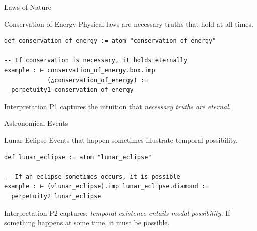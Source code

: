 \documentclass[aspectratio=169,11pt]{beamer}
\begin{document}
\begin{frame}[fragile]{Laws of Nature}

\begin{block}{Conservation of Energy}
Physical laws are necessary truths that hold at all times.
\end{block}

\begin{lstlisting}
def conservation_of_energy := atom "conservation_of_energy"

-- If conservation is necessary, it holds eternally
example : ⊢ conservation_of_energy.box.imp
            (△conservation_of_energy) :=
  perpetuity1 conservation_of_energy
\end{lstlisting}

\vspace{0.3cm}

\begin{block}{Interpretation}
P1 captures the intuition that \emph{necessary truths are eternal}.
\end{block}

\end{frame}

\begin{frame}[fragile]{Astronomical Events}

\begin{block}{Lunar Eclipse}
Events that happen sometimes illustrate temporal possibility.
\end{block}

\begin{lstlisting}
def lunar_eclipse := atom "lunar_eclipse"

-- If an eclipse sometimes occurs, it is possible
example : ⊢ (▽lunar_eclipse).imp lunar_eclipse.diamond :=
  perpetuity2 lunar_eclipse
\end{lstlisting}

\vspace{0.3cm}

\begin{block}{Interpretation}
P2 captures: \emph{temporal existence entails modal possibility}.
If something happens at some time, it must be possible.
\end{block}

\end{frame}
\end{document}
